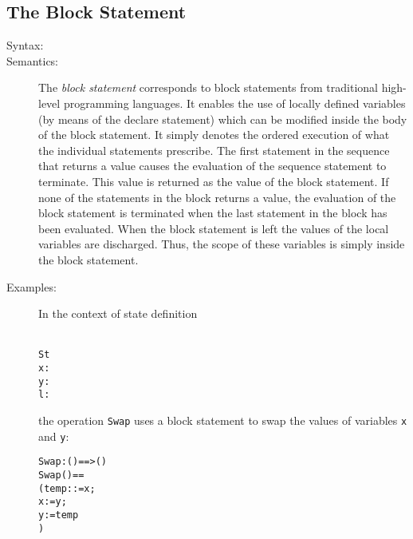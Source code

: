 \documentclass[\pformat,12pt]{article}
\begin{document}
\subsection{The Block Statement} \label{dcl-stmt}

\begin{description}
\item[Syntax:]




\item[Semantics:] The {\it block statement} corresponds to block statements
  from traditional high-level programming languages.  It enables the use of
  locally defined variables (by means of the declare statement) which can
  be modified inside the body of the block statement. It simply denotes the
  ordered execution of what the individual statements prescribe. The first
  statement in the sequence that returns a value causes the evaluation of
  the sequence statement to terminate. This value is returned as the
  value of the block statement. If none of the statements in the block
  returns a value, the evaluation of the block statement is terminated when
  the last statement in the block has been evaluated. When the block
  statement is left the values of the local variables are discharged. Thus,
  the scope of these variables is simply inside the block statement.
      
\item[Examples:] In the context of 
state definition
  \begin{alltt}\label{stdef}
   St 
    x:
    y:
    l:
  \end{alltt}
  the operation \texttt{Swap} uses a block statement to swap the values of 
  variables \texttt{x} and \texttt{y}:
  \begin{alltt}
  Swap : () ==> ()
  Swap () ==
    ( temp:  := x;
     x := y;
     y := temp
    )
  \end{alltt}

\end{description}
\end{document}
